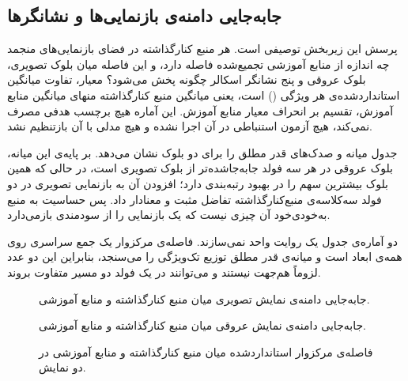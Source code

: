 \subsection{جابه‌جایی دامنه‌ی بازنمایی‌ها و نشانگرها}

پرسش این زیربخش توصیفی است. هر منبع کنارگذاشته در فضای بازنمایی‌های منجمد چه اندازه از منابع آموزشی تجمیع‌شده فاصله دارد، و این فاصله میان بلوک تصویری، بلوک عروقی و پنج نشانگر اسکالر چگونه پخش می‌شود؟ معیار، تفاوت میانگین استانداردشده‌ی هر ویژگی () است، یعنی میانگین منبع کنارگذاشته منهای میانگین منابع آموزش، تقسیم بر انحراف معیار منابع آموزش. این آماره هیچ برچسب هدفی مصرف نمی‌کند، هیچ آزمون استنباطی در آن اجرا نشده و هیچ مدلی با آن بازتنظیم نشد.



جدول میانه و صدک‌های قدر مطلق  را برای دو بلوک نشان می‌دهد. بر پایه‌ی این میانه، بلوک عروقی در هر سه فولد جابه‌جاشده‌تر از بلوک تصویری است، در حالی که همین بلوک بیشترین سهم را در بهبود رتبه‌بندی دارد؛ افزودن آن به بازنمایی تصویری در دو فولد سه‌کلاسه‌ی منبع‌کنارگذاشته تفاضل مثبت و معنادار داد. پس حساسیت به منبع به‌خودی‌خود آن چیزی نیست که یک بازنمایی را از سودمندی بازمی‌دارد.

دو آماره‌ی جدول یک روایت واحد نمی‌سازند. فاصله‌ی مرکزوار یک جمع سراسری روی همه‌ی ابعاد است و میانه‌ی قدر مطلق  توزیع تک‌ویژگی را می‌سنجد، بنابراین این دو عدد لزوماً هم‌جهت نیستند و می‌توانند در یک فولد دو مسیر متفاوت بروند.

\begin{figure}[htbp]
  \centering
  \caption{جابه‌جایی دامنه‌ی نمایش تصویری میان منبع کنارگذاشته و منابع آموزشی.}
  
\end{figure}

\begin{figure}[htbp]
  \centering
  \caption{جابه‌جایی دامنه‌ی نمایش عروقی میان منبع کنارگذاشته و منابع آموزشی.}
  \label{fig:U25}
\end{figure}

\begin{figure}[htbp]
  \centering
  \caption{فاصله‌ی مرکزوار استانداردشده میان منبع کنارگذاشته و منابع آموزشی در دو نمایش.}
  \label{fig:U26}
\end{figure}

